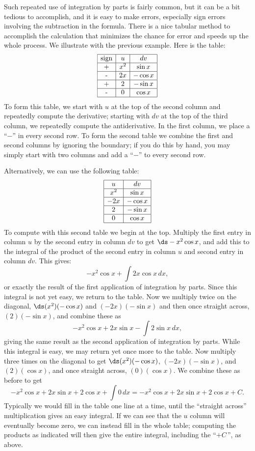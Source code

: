 Such repeated use of integration by parts is fairly common, but it can
be a bit tedious to accomplish, and it is easy to make
errors, especially sign errors involving the subtraction in the
formula. There is a nice tabular method to accomplish the calculation
that minimizes the chance for error and speeds up the whole
process. We illustrate with the previous example. Here is the
table:
$$\begin{array}{|c|c|c|}
\hline
\mbox{sign}& u& dv\\\hline
\mbox{+}& x^2& \sin x\\\hline
\mbox{-}& 2x& -\cos x\\\hline
\mbox{+}& 2& -\sin x\\\hline
\mbox{-}& 0& \cos x\\\hline
\end{array}$$
To form this table, we start with $u$ at the top of the second
column and repeatedly compute the derivative; starting with $dv$ at
the top of the third column, we repeatedly compute the
antiderivative. In the first column, we place a ``$-$'' in every
second row. To form the 
second table we combine the first and second columns by
ignoring the boundary; if you do this by hand, you may simply start
with two columns and add a ``$-$'' to every second row.

Alternatively, we can use the following table:
$$\begin{array}{|c|c|}
\hline
u& dv\\\hline
x^2& \sin x\\\hline
-2x& -\cos x\\\hline
2& -\sin x\\\hline
0& \cos x\\\hline
\end{array}$$
To compute with this second table we begin at the top. Multiply the
first entry in column $u$ by the second entry in column $dv$ to get
$\ds -x^2\cos x$, and add this to the integral of the product of the
second entry in column $u$ and second entry in column $dv$.  This
gives:
$$-x^2\cos x+\int 2x\cos x\,dx,$$
or exactly the result of the first application of integration by
parts.  Since this integral is not yet easy, we return to the table.
Now we multiply twice on the diagonal, $\ds (x^2)(-\cos x)$ and
$(-2x)(-\sin x)$ and then once straight across, $(2)(-\sin x)$, and
combine these as
$$-x^2\cos x+2x\sin x-\int 2\sin x\,dx,$$
giving the same result as the second application of integration by
parts. While this integral is easy, we may return yet once more to the
table. Now multiply three times on the diagonal to get $\ds
(x^2)(-\cos x)$, $(-2x)(-\sin x)$, and $(2)(\cos x)$, and once
straight across, $(0)(\cos x)$. We combine these as before to get
$$
  -x^2\cos x+2x\sin x +2\cos x+\int 0\,dx=
  -x^2\cos x+2x\sin x +2\cos x+C.
$$
Typically we would fill in the table one line at a time, until the
``straight across'' multiplication gives an easy integral. If we can
see that the $u$ column will eventually become zero, we can instead
fill in the whole table; computing the products as indicated will then
give the entire integral, including the ``$+C\,$'', as above.

